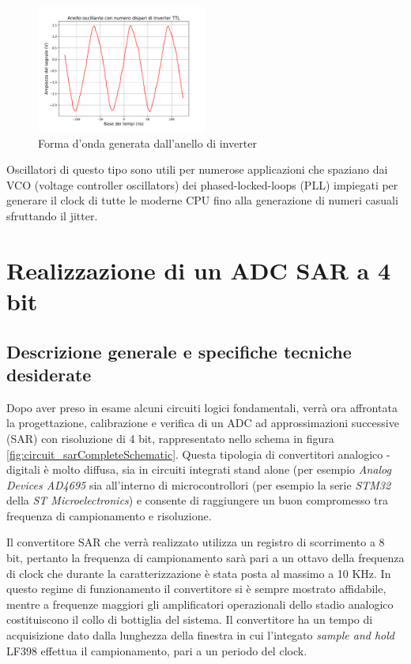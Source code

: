 \documentclass[journal]{IEEEtran}
\begin{document}
\begin{figure}[H]%
\begin{center}
\includegraphics[width=0.50\textwidth]{analysis/output/oscillating-ring.pdf}
\caption{Forma d'onda generata dall'anello di inverter}
\label{fig:graph_ring_oscillator}
\end{center}
\end{figure}


Oscillatori di questo tipo sono utili per numerose applicazioni che spaziano dai VCO (voltage controller oscillators) dei phased-locked-loops (PLL) impiegati per generare il clock di tutte le moderne CPU fino alla generazione di numeri casuali sfruttando il jitter.


\section{Realizzazione di un ADC SAR a 4 bit}

\subsection{Descrizione generale e specifiche tecniche desiderate}
Dopo aver preso in esame alcuni circuiti logici fondamentali, verrà ora affrontata la progettazione, calibrazione e verifica di un ADC ad approssimazioni successive (SAR) con risoluzione di 4 bit, rappresentato nello schema in figura \ref{fig:circuit_sarCompleteSchematic}. Questa tipologia di convertitori analogico - digitali è molto diffusa, sia in circuiti integrati stand alone (per esempio \textit{Analog Devices AD4695} sia all'interno di microcontrollori (per esempio la serie \textit{STM32} della \textit{ST Microelectronics}) e consente di raggiungere un buon compromesso tra frequenza di campionamento e risoluzione.

Il convertitore SAR che verrà realizzato utilizza un registro di scorrimento a 8 bit, pertanto la frequenza di campionamento sarà pari a un ottavo della frequenza di clock che durante la caratterizzazione è stata posta al massimo a 10 KHz. In questo regime di funzionamento il convertitore si è sempre mostrato affidabile, mentre a frequenze maggiori gli amplificatori operazionali dello stadio analogico costituiscono il collo di bottiglia del sistema. Il convertitore ha un tempo di acquisizione dato dalla lunghezza della finestra in cui l'integato \textit{sample and hold} LF398 effettua il campionamento, pari a un periodo del clock.
\end{document}
